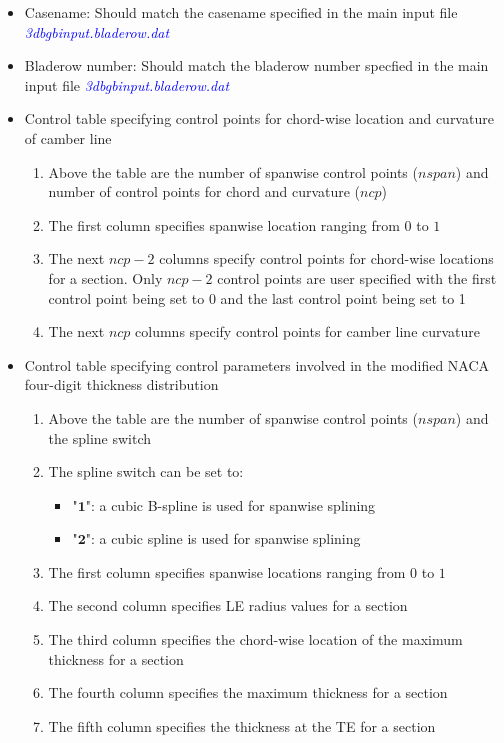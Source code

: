 \documentclass[8pt]{article}
\begin{document}
\noindent
\begin{itemize}[leftmargin=*]
    \item Casename: Should match the casename specified in the main input file \textit{\textcolor{blue}{3dbgbinput.bladerow.dat}}
    \item Bladerow number: Should match the bladerow number specfied in the main input file \textit{\textcolor{blue}{3dbgbinput.bladerow.dat}}
    \item Control table specifying control points for chord-wise location and curvature of camber line
    \begin{enumerate}[label=\alph*]
        \item Above the table are the number of spanwise control points ($nspan$) and number of control points for chord and curvature ($ncp$)
        \item The first column specifies spanwise location ranging from $0$ to $1$
        \item The next $ncp - 2$ columns specify control points for chord-wise locations for a section. Only $ncp - 2$ control points are user specified with the first control point being set to 0 and the last control point being set to 1
        \item The next $ncp$ columns specify control points for camber line curvature
    \end{enumerate}
    \item Control table specifying control parameters involved in the modified NACA four-digit thickness distribution
    \begin{enumerate}[label=\alph*]
        \item Above the table are the number of spanwise control points ($nspan$) and the spline switch
        \item The spline switch can be set to:
        \begin{itemize}[label=\FilledSmallSquare]
            \item "$\mathbf{1}$": a cubic B-spline is used for spanwise splining
            \item "$\mathbf{2}$": a cubic spline is used for spanwise splining
        \end{itemize}
        \item The first column specifies spanwise locations ranging from $0$ to $1$
        \item The second column specifies LE radius values for a section
        \item The third column specifies the chord-wise location of the maximum thickness for a section
        \item The fourth column specifies the maximum thickness for a section
        \item The fifth column specifies the thickness at the TE for a section
    \end{enumerate}
\end{itemize}
\end{document}
